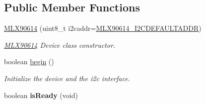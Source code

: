 \subsection*{Public Member Functions}
\begin{DoxyCompactItemize}
\item 
\hyperlink{class_m_l_x90614_abd5039fd7e21e82db9f0cf2575f0d23a}{M\-L\-X90614} (uint8\-\_\-t i2caddr=\hyperlink{_m_l_x90614_8h_a4814993dbb3667d65ff70fe5c9f76858}{M\-L\-X90614\-\_\-\-I2\-C\-D\-E\-F\-A\-U\-L\-T\-A\-D\-D\-R})
\begin{DoxyCompactList}\small\item\em \hyperlink{class_m_l_x90614}{M\-L\-X90614} Device class constructor. \end{DoxyCompactList}\item 
\hypertarget{class_m_l_x90614_ade3c27bfa8ff06c043e2c83743e38b5c}{boolean \hyperlink{class_m_l_x90614_ade3c27bfa8ff06c043e2c83743e38b5c}{begin} ()}\label{class_m_l_x90614_ade3c27bfa8ff06c043e2c83743e38b5c}

\begin{DoxyCompactList}\small\item\em Initialize the device and the i2c interface. \end{DoxyCompactList}\item 
\hypertarget{class_m_l_x90614_a3fa540d984b00a7c062be1b3e84bd881}{boolean {\bfseries is\-Ready} (void)}\label{class_m_l_x90614_a3fa540d984b00a7c062be1b3e84bd881}


\end{DoxyCompactItemize}
